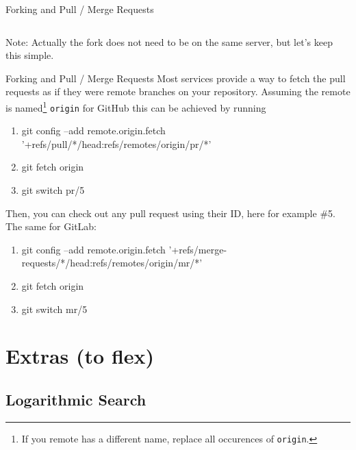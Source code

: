 \documentclass[xetex]{beamer}
\begin{document}
\begin{frame}[fragile]{Forking and Pull / Merge Requests}
\begin{columns}
\begin{column}{1.1\linewidth}
    \end{column}
  \end{columns}

  \begin{center}
    \tiny Note: Actually the fork does not need to be on the same server, but let's keep this simple.
  \end{center}
\end{frame}

\begin{frame}{Forking and Pull / Merge Requests}
  Most services provide a way to fetch the pull requests as if they were
  remote branches on your repository. Assuming the remote is named\footnote{
    If you remote has a different name, replace all occurences of
    \texttt{origin}.
  } \texttt{origin} for GitHub this can be achieved by running
  \begin{enumerate} \ttfamily \footnotesize
    \item git config --add remote.origin.fetch '+refs/pull/*/head:refs/remotes/origin/pr/*'
    \item git fetch origin
    \item git switch pr/5
  \end{enumerate}

  Then, you can check out any pull request using their ID, here for example
  \#5. The same for GitLab:
  \begin{enumerate} \ttfamily \footnotesize
    \item git config --add remote.origin.fetch '+refs/merge-requests/*/head:refs/remotes/origin/mr/*'
    \item git fetch origin
    \item git switch mr/5
  \end{enumerate}
\end{frame}

\section{Extras (to flex)}

\subsection{Logarithmic Search}
\end{document}

